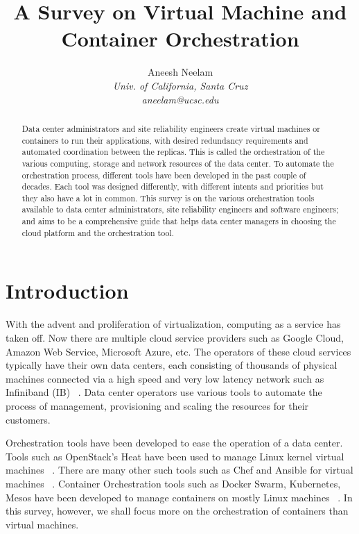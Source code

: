 \documentclass[10pt,twocolumn]{article}
\begin{document}
\title{A Survey on Virtual Machine and Container Orchestration}

\author{
Aneesh Neelam \\
\textit{Univ. of California, Santa Cruz} \\
\textit{aneelam@ucsc.edu}
}

\maketitle
\thispagestyle{empty}

\begin{abstract}

  Data center administrators and site reliability engineers create virtual machines or containers to run their applications, with desired redundancy requirements and automated coordination between the replicas.
  This is called the orchestration of the various computing, storage and network resources of the data center.
  To automate the orchestration process, different tools have been developed in the past couple of decades.
  Each tool was designed differently, with different intents and priorities but they also have a lot in common.
  This survey is on the various orchestration tools available to data center administrators, site reliability engineers and software engineers;
  and aims to be a comprehensive guide that helps data center managers in choosing the cloud platform and the orchestration tool.

\end{abstract}

\section{Introduction}

With the advent and proliferation of virtualization, computing as a service has taken off.
Now there are multiple cloud service providers such as Google Cloud, Amazon Web Service, Microsoft Azure, etc.
The operators of these cloud services typically have their own data centers, each consisting of thousands of physical machines connected via a high speed and very low latency network such as Infiniband (IB) ~\cite{intro_infiniband}.
Data center operators use various tools to automate the process of management, provisioning and scaling the resources for their customers.

Orchestration tools have been developed to ease the operation of a data center.
Tools such as OpenStack's Heat have been used to manage Linux kernel virtual machines ~\cite{openstack}.
There are many other such tools such as Chef and Ansible for virtual machines ~\cite{chef, ansible}.
Container Orchestration tools such as Docker Swarm, Kubernetes, Mesos have been developed to manage containers on mostly Linux machines ~\cite{docker_swarm, kubernetes, mesos}.
In this survey, however, we shall focus more on the orchestration of containers than virtual machines.
\end{document}
